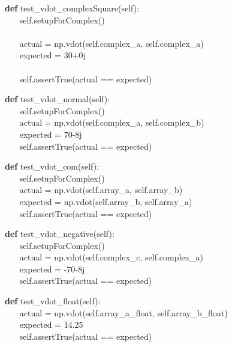 \documentclass[a4paper,11pt]{article}
\begin{document}
\begin{algorithm}[H]
	\textbf{def} test\_vdot\_complexSquare(self):
	\\ $ ~~~~~~~~ $self.setupForComplex()
	\\
	\\ $ ~~~~~~~~ $actual = np.vdot(self.complex\_a, self.complex\_a)
	\\ $ ~~~~~~~~ $expected = 30+0j
	\\
	\\ $ ~~~~~~~~ $self.assertTrue(actual == expected)
\end{algorithm}

\begin{algorithm}[H]
    \textbf{def} test\_vdot\_normal(self):
\\ $ ~~~~~~~~ $self.setupForComplex()
\\ $ ~~~~~~~~ $actual = np.vdot(self.complex\_a, self.complex\_b)
\\ $ ~~~~~~~~ $expected = 70-8j
\\ $ ~~~~~~~~ $self.assertTrue(actual == expected)
\end{algorithm}

\begin{algorithm}[H]
    \textbf{def} test\_vdot\_com(self):
\\ $ ~~~~~~~~ $self.setupForComplex()
\\ $ ~~~~~~~~ $actual = np.vdot(self.array\_a, self.array\_b)
\\ $ ~~~~~~~~ $expected = np.vdot(self.array\_b, self.array\_a)
\\ $ ~~~~~~~~ $self.assertTrue(actual == expected)
\end{algorithm}

\begin{algorithm}[H]
    \textbf{def} test\_vdot\_negative(self):
\\ $ ~~~~~~~~ $self.setupForComplex()
\\ $ ~~~~~~~~ $actual = np.vdot(self.complex\_c, self.complex\_a)
\\ $ ~~~~~~~~ $expected = -70-8j
\\ $ ~~~~~~~~ $self.assertTrue(actual == expected)
\end{algorithm}

\begin{algorithm}[H]
    \textbf{def} test\_vdot\_float(self):
\\ $ ~~~~~~~~ $actual = np.vdot(self.array\_a\_float, self.array\_b\_float)
\\ $ ~~~~~~~~ $expected = 14.25
\\ $ ~~~~~~~~ $self.assertTrue(actual == expected)
\end{algorithm}
\end{document}
